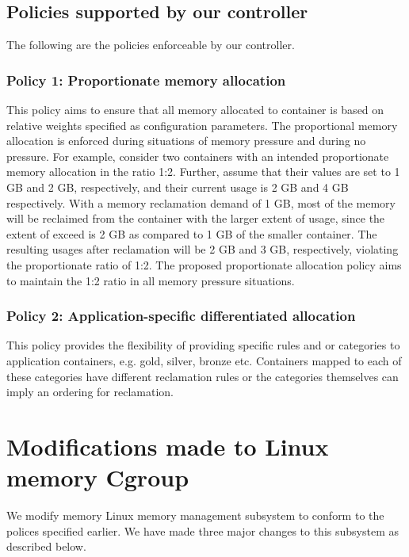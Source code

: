       \subsection{Policies supported by our controller}
      
	The following are the policies enforceable by our controller.  
	
	\subsubsection{Policy 1: Proportionate memory allocation}
	  This policy aims to ensure that all memory allocated to container is based on relative weights specified as configuration parameters.
	  The proportional memory allocation is enforced during situations of memory pressure and during no pressure. For example, consider 
	  two containers with an intended proportionate memory allocation in the ratio 1:2. Further, assume that their \sol{} values are set 
	  to 1 GB and 2 GB, respectively, and their current usage is 2 GB and 4 GB respectively.
	  With a memory reclamation demand of 1 GB, most of the memory will be reclaimed from the container with the larger extent of usage, 
	  since the extent of exceed is 2 GB as compared to 1 GB of the smaller container. The resulting usages after reclamation will be 2 GB 
	  and 3 GB, respectively, violating the proportionate ratio of 1:2. The proposed proportionate allocation policy aims to maintain 
	  the 1:2 ratio in all memory pressure situations.
	
	\subsubsection{Policy 2: Application-specific differentiated allocation}
	  This policy provides the flexibility of providing specific rules and or categories to application containers, e.g. gold, silver,
	  bronze etc. Containers mapped to each of these categories have different reclamation rules or the categories themselves can 
	  imply an ordering for reclamation.
  
  \section{Modifications made to Linux memory Cgroup}
      
      We modify memory Linux \cg{} memory management subsystem to conform to the polices specified earlier. We have made
      three major changes to this subsystem as described below.
     
